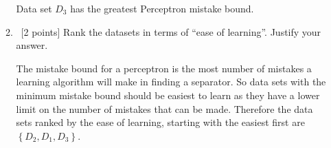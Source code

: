 \begin{enumerate}
\begin{enumerate}
Data set $D_3$ has the greatest Perceptron mistake bound.
    
  \item ~[2 points] Rank the datasets in terms of ``ease of
    learning''. Justify your answer.
    
The mistake bound for a perceptron is the most number of mistakes a learning algorithm will make in finding a separator. So data sets with the minimum mistake bound should be easiest to learn as they have a lower limit on the number of mistakes that can be made. Therefore the data sets ranked by the ease of learning, starting with the easiest first are $\left\{ D_2, D_1, D_3\right\}$.
    
  \end{enumerate}

\end{enumerate}


